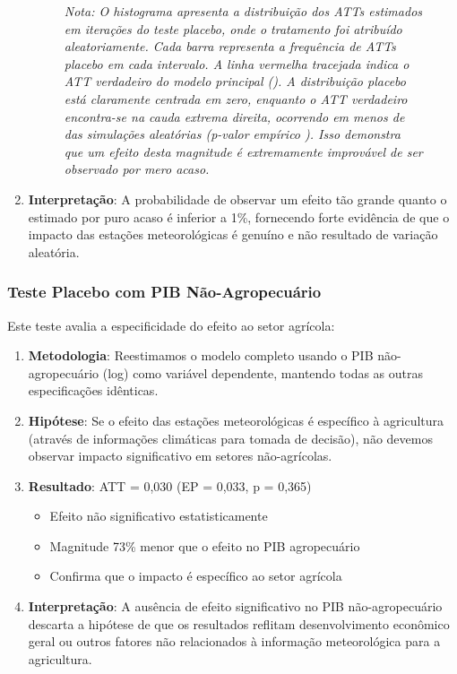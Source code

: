 \documentclass[
	12pt,				%
	oneside,			%
	a4paper,			%
	english,			%
	french,				%
	spanish,			%
	brazil				%
	]{abntex2}
\begin{document}
\begin{enumerate}
\begin{figure}[!htbp]
\textit{Nota: O histograma apresenta a distribuição dos ATTs estimados em \placebonsims{} iterações do teste placebo, onde o tratamento foi atribuído aleatoriamente. Cada barra representa a frequência de ATTs placebo em cada intervalo. A linha vermelha tracejada indica o ATT verdadeiro do modelo principal (\placebotruatt). A distribuição placebo está claramente centrada em zero, enquanto o ATT verdadeiro encontra-se na cauda extrema direita, ocorrendo em menos de \placebopvaluepct{} das simulações aleatórias (p-valor empírico \placebopvalue). Isso demonstra que um efeito desta magnitude é extremamente improvável de ser observado por mero acaso.}
\end{figure}

\item \textbf{Interpretação}: A probabilidade de observar um efeito tão grande quanto o estimado por puro acaso é inferior a 1\%, fornecendo forte evidência de que o impacto das estações meteorológicas é genuíno e não resultado de variação aleatória.
\end{enumerate}

\subsubsection{Teste Placebo com PIB Não-Agropecuário}

Este teste avalia a especificidade do efeito ao setor agrícola:

\begin{enumerate}
\item \textbf{Metodologia}: Reestimamos o modelo completo usando o PIB não-agropecuário (log) como variável dependente, mantendo todas as outras especificações idênticas.

\item \textbf{Hipótese}: Se o efeito das estações meteorológicas é específico à agricultura (através de informações climáticas para tomada de decisão), não devemos observar impacto significativo em setores não-agrícolas.

\item \textbf{Resultado}: ATT = 0,030 (EP = 0,033, p = 0,365)
\begin{itemize}
\item Efeito não significativo estatisticamente
\item Magnitude 73\% menor que o efeito no PIB agropecuário
\item Confirma que o impacto é específico ao setor agrícola
\end{itemize}

\item \textbf{Interpretação}: A ausência de efeito significativo no PIB não-agropecuário descarta a hipótese de que os resultados reflitam desenvolvimento econômico geral ou outros fatores não relacionados à informação meteorológica para a agricultura.
\end{enumerate}
\end{document}
